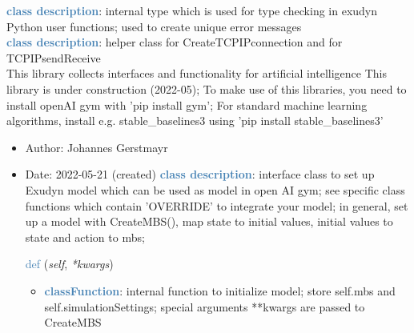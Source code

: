 \begin{itemize}[leftmargin=1.4cm]
%
\noindent\textcolor{steelblue}{{\bf class description}}:  internal type which is used for type checking in exudyn Python user functions; used to create unique error messages
\vspace{3pt} \\ 
\noindent\textcolor{steelblue}{{\bf class description}}:  helper class for CreateTCPIPconnection and for TCPIPsendReceive
\vspace{3pt} \\ 
\label{sec:module:artificialIntelligence}
  This library collects interfaces and functionality for artificial intelligence
           This library is under construction (2022-05);
           To make use of this libraries, you need to install openAI gym with 'pip install gym';
           For standard machine learning algorithms, install e.g. stable\_baselines3 using 'pip install stable\_baselines3'
\begin{itemize}[leftmargin=1.4cm]
\setlength{\itemindent}{-1.4cm}
\item[]Author:    Johannes Gerstmayr
\item[]Date:      2022-05-21 (created)
\ei
{}
\noindent\textcolor{steelblue}{{\bf class description}}:  interface class to set up Exudyn model which can be used as model in open AI gym;
see specific class functions which contain 'OVERRIDE' to integrate your model;
in general, set up a model with CreateMBS(), map state to initial values, initial values to state and action to mbs;
\vspace{3pt} \\ 
\begin{flushleft}
\noindent \textcolor{steelblue}{def {\bf {}}}\label{sec:artificialIntelligence:OpenAIGymInterfaceEnv(Env):__init__}
({\it self}, {\it **kwargs})
\end{flushleft}
\setlength{\itemindent}{0.7cm}
\begin{itemize}[leftmargin=0.7cm]
\item[--]\textcolor{steelblue}{\bf classFunction}: internal function to initialize model; store self.mbs and self.simulationSettings; special arguments **kwargs are passed to CreateMBS
\vspace{12pt}\end{itemize}

\end{itemize}
\end{itemize}
